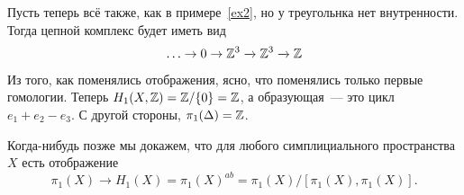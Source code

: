     \begin{example}
        Пусть теперь всё также, как в примере~\ref{ex2}, но у треугольнка нет внутренности.
        Тогда цепной комплекс будет иметь вид
        \[ \ldots \to 0 \to \mathbb{Z}^3 \xrightarrow{} \mathbb{Z}^3 \xrightarrow{} \mathbb{Z} \]
        Из того, как поменялись отображения, ясно, что поменялись только первые гомологии. Теперь $H_{1}(X, \mathbb{Z}) = \mathbb{Z}/\{ 0 \} = \mathbb{Z}$, а
        образующая~--- это цикл $e_1 + e_2 - e_3$. С другой стороны, $\pi_{1}(\Delta) = \mathbb{Z}$.
    \end{example}

    \begin{remark}
       Когда-нибудь позже мы докажем, что для любого симплициального пространства $X$ есть отображение
        \[ \pi_{1}(X) \to H_{1}(X) = \pi_{1}(X)^{ab} = \pi_{1}(X)/[\pi_{1}(X), \pi_{1}(X)].\]
    \end{remark}

